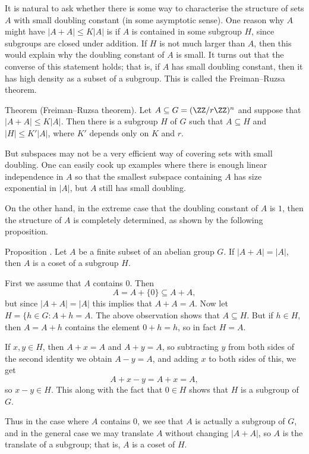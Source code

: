 It is natural to ask whether there is some way to characterise the structure of sets $A$ with small doubling
constant (in some asymptotic sense). One reason why $A$ might have $|A+A|\le K|A|$ is if $A$ is contained
in some subgroup $H$, since subgroups are closed under addition. If $H$ is not much larger than $A$,
then this would explain why the doubling constant of $A$ is small. It turns out that the converse of
this statement holds; that is, if $A$ has small doubling constant, then it has high density as a subset
of a subgroup. This is called the Freiman--Ruzsa theorem.

\parenproclaim Theorem {\advthm} (Freiman--Ruzsa theorem). Let $A\subseteq G = (\ZZ/r\ZZ)^n$ and suppose
that $|A+A|\le K|A|$. Then there is a subgroup $H$ of $G$ such that $A\subseteq H$ and $|H|\le K'|A|$,
where $K'$ depends only on $K$ and $r$.

But subspaces may not be a very efficient way of covering sets with small doubling. One can easily
cook up examples where there is enough linear independence in $A$ so that the smallest subspace
containing $A$ has size exponential in $|A|$, but $A$ still has small doubling.

On the other hand, in the extreme case that the doubling
constant of $A$ is $1$, then the structure of $A$ is completely determined, as shown by the following proposition.

\edef\propdoublingone{\the\sectcount.\the\thmcount}
\proclaim Proposition \advthm. Let $A$ be a finite subset of an abelian group $G$. If $|A+A| = |A|$,
then $A$ is a coset of a subgroup $H$.

\proof First we assume that $A$ contains $0$. Then
$$A = A + \{0\} \subseteq A+A,$$
but since $|A+A| = |A|$ this implies that $A+A = A$. Now let $H = \{h\in G : A + h = A$. The above observation
shows that $A\subseteq H$. But if $h\in H$, then $A = A+h$ contains the element $0+h = h$, so in
fact $H=A$.

If $x,y\in H$, then $A+x = A$ and $A+y=A$, so subtracting $y$ from both sides of the second identity we obtain
$A-y = A$, and adding $x$ to both sides of this, we get
$$A + x-y = A+x = A,$$
so $x-y\in H$.
This along with the fact that $0\in H$ shows that $H$ is a subgroup of $G$.

Thus in the case where $A$ contains $0$, we see that $A$ is actually a subgroup of $G$, and
in the general case we may translate $A$ without changing $|A+A|$, so $A$ is the translate of a subgroup;
that is, $A$ is a coset of $H$.\slug

